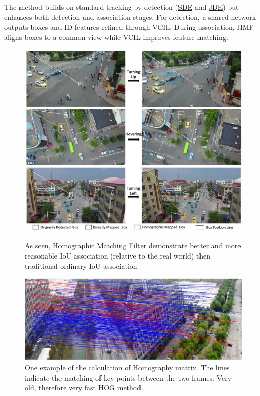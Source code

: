 \documentclass[12pt, a4paper]{article}
\begin{document}
The method builds on standard tracking-by-detection (\hyperref[sec:Separate_Detection_Embedding]{SDE} and \hyperref[sec:Joint_detection_embedding]{JDE}) but enhances both detection and association stages. For detection, a shared network outputs boxes and ID features refined through VCIL. During association, HMF aligns boxes to a common view while VCIL improves feature matching.

\begin{figure}[h]
    \centering
    \begin{minipage}{0.5\textwidth}
        \centering
        \includegraphics[width=\linewidth]{pictures/homography_UAV.jpeg}
        \caption{As seen, Homographic Matching Filter demonstrate better and more reasonable IoU association (relative to the real world) then traditional ordinary IoU association}
        \label{fig:UAV_matching}
    \end{minipage}
    \hfill
    \begin{minipage}{0.45\textwidth}
        \centering
        \includegraphics[width=\linewidth]{pictures/UAV_hom_map.jpeg}
        \caption{One example of the calculation of Homography matrix. The lines indicate the matching of key points between the two frames. Very old, therefore very fast HOG method.}
        \label{fig:UAV_homography}
    \end{minipage}
\end{figure}
\end{document}
